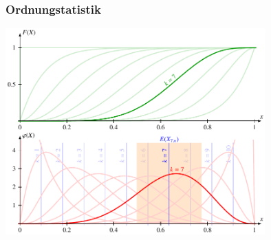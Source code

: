 %
%
%
\bgroup
\begin{frame}[t]
\setlength{\abovedisplayskip}{5pt}
\setlength{\belowdisplayskip}{5pt}
\frametitle{Ordnungstatistik}
\vspace*{-18pt}
\begin{center}
\includegraphics[width=10cm]{../../buch/chapters/040-rekursion/images/order.pdf}
\end{center}
\end{frame}
\egroup

